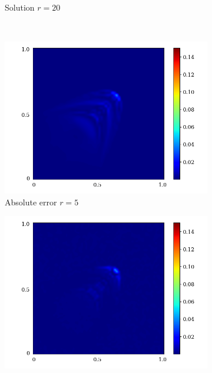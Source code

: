 \begin{figure}[!htb]
\begin{center}
\begin{subfigure}[b]{0.23\textwidth}
\begin{center}
            \end{center}
            \caption{Solution $r = 20$}
        \end{subfigure}\\  
        \begin{subfigure}[b]{0.23\textwidth}
            \begin{center}
                \includegraphics[trim = {0, 0, 3cm, 0}, clip, width=\textwidth]{Pictures/X-rom-NE-DAE-5-abs-err.png}
            \end{center}
            \caption{Absolute error $r = 5$}
        \end{subfigure}  
        \begin{subfigure}[b]{0.23\textwidth}
            \begin{center}
                \includegraphics[trim = {0, 0, 3cm, 0}, clip, width=\textwidth]{Pictures/X-rom-NE-DAE-10-abs-err.png}

\end{center}
\end{subfigure}
\end{center}
\end{figure}
